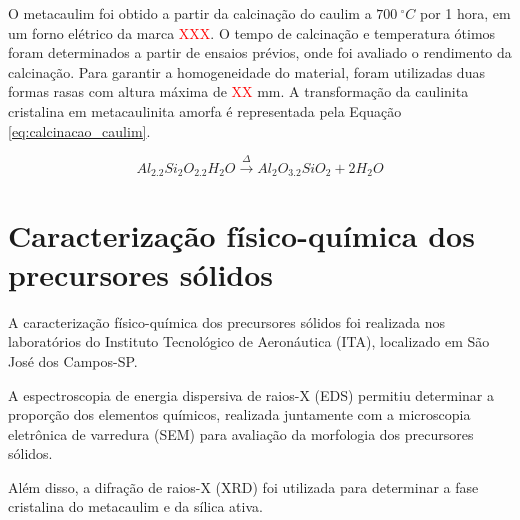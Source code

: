 O metacaulim foi obtido a partir da calcinação do caulim a $700\ ^\circ C$ por 1 hora, em um forno elétrico da marca \textcolor{red}{XXX}.
O tempo de calcinação e temperatura ótimos foram determinados a partir de ensaios prévios, onde foi avaliado o rendimento da calcinação.
Para garantir a homogeneidade do material, foram utilizadas duas formas rasas com altura máxima de \textcolor{red}{XX} mm.
A transformação da caulinita cristalina em metacaulinita amorfa é representada pela Equação \ref{eq:calcinacao_caulim}.

\begin{equation}
    \label{eq:calcinacao_caulim}
        Al_2.2Si_2O_2.2H_2O \xrightarrow{\Delta} Al_2O_3.2SiO_2 + 2 H_2O
\end{equation}

\section{Caracterização físico-química dos precursores sólidos}
\label{sec:caracterizacao_fisico_quimica_dos_precursores_solidos}

A caracterização físico-química dos precursores sólidos foi realizada nos laboratórios do Instituto Tecnológico de Aeronáutica (ITA), localizado em São José dos Campos-SP.

A espectroscopia de energia dispersiva de raios-X (EDS) permitiu determinar a proporção dos elementos químicos, realizada juntamente com a microscopia eletrônica de varredura (SEM) para avaliação da morfologia dos precursores sólidos.

Além disso, a difração de raios-X (XRD) foi utilizada para determinar a fase cristalina do metacaulim e da sílica ativa.



